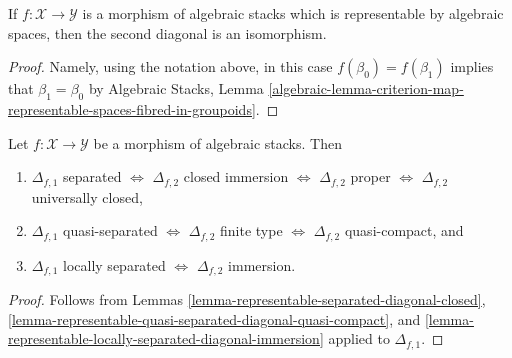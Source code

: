 \begin{lemma}
\label{lemma-second-diagonal}
If $f : \mathcal{X} \to \mathcal{Y}$ is a morphism of algebraic stacks
which is representable by algebraic spaces, then the second diagonal
is an isomorphism.
\end{lemma}

\begin{proof}
Namely, using the notation above,
in this case $f(\beta_0) = f(\beta_1)$ implies that $\beta_1 = \beta_0$ by
Algebraic Stacks, Lemma
\ref{algebraic-lemma-criterion-map-representable-spaces-fibred-in-groupoids}.
\end{proof}

\begin{lemma}
\label{lemma-first-diagonal-separated-second-diagonal-closed}
Let $f : \mathcal{X} \to \mathcal{Y}$ be a morphism of algebraic stacks.
Then
\begin{enumerate}
\item $\Delta_{f, 1}$ separated $\Leftrightarrow$
$\Delta_{f, 2}$ closed immersion $\Leftrightarrow$
$\Delta_{f, 2}$ proper $\Leftrightarrow$
$\Delta_{f, 2}$ universally closed,
\item $\Delta_{f, 1}$ quasi-separated $\Leftrightarrow$
$\Delta_{f, 2}$ finite type $\Leftrightarrow$ $\Delta_{f, 2}$ quasi-compact,
and
\item $\Delta_{f, 1}$ locally separated $\Leftrightarrow$
$\Delta_{f, 2}$ immersion.
\end{enumerate}
\end{lemma}

\begin{proof}
Follows from
Lemmas \ref{lemma-representable-separated-diagonal-closed},
\ref{lemma-representable-quasi-separated-diagonal-quasi-compact}, and
\ref{lemma-representable-locally-separated-diagonal-immersion}
applied to $\Delta_{f, 1}$.
\end{proof}

